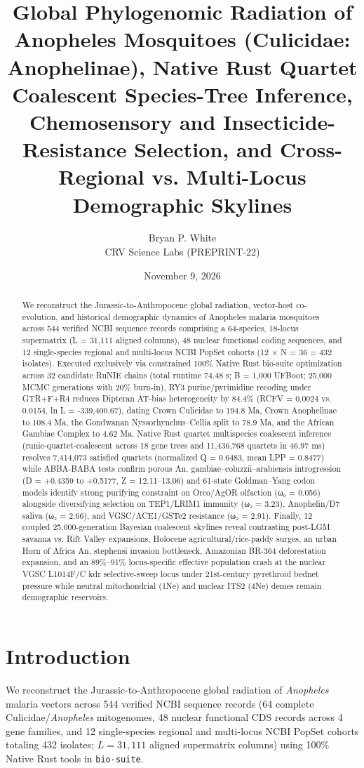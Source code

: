 \documentclass[10pt,letterpaper]{article}
\title{Global Phylogenomic Radiation of Anopheles Mosquitoes (Culicidae: Anophelinae), Native Rust Quartet Coalescent Species-Tree Inference, Chemosensory and Insecticide-Resistance Selection, and Cross-Regional vs. Multi-Locus Demographic Skylines}
\author{Bryan P. White \\ CRV Science Labs (PREPRINT-22)}
\date{November 9, 2026}
\begin{document}
\maketitle
\begin{abstract}
We reconstruct the Jurassic-to-Anthropocene global radiation, vector-host co-evolution, and historical demographic dynamics of Anopheles malaria mosquitoes across 544 verified NCBI sequence records comprising a 64-species, 18-locus supermatrix (L = 31,111 aligned columns), 48 nuclear functional coding sequences, and 12 single-species regional and multi-locus NCBI PopSet cohorts (12 × N = 36 = 432 isolates). Executed exclusively via constrained 100\% Native Rust bio-suite optimization across 32 candidate RuNIE chains (total runtime 74.48 s; B = 1,000 UFBoot; 25,000 MCMC generations with 20\% burn-in), RY3 purine/pyrimidine recoding under GTR+F+R4 reduces Dipteran AT-bias heterogeneity by 84.4\% (RCFV = 0.0024 vs. 0.0154, ln L = -339,400.67), dating Crown Culicidae to 194.8 Ma, Crown Anophelinae to 108.4 Ma, the Gondwanan Nyssorhynchus–Cellia split to 78.9 Ma, and the African Gambiae Complex to 4.62 Ma. Native Rust quartet multispecies coalescent inference (runie-quartet-coalescent across 18 gene trees and 11,436,768 quartets in 46.97 ms) resolves 7,414,073 satisfied quartets (normalized Q = 0.6483, mean LPP = 0.8477) while ABBA-BABA tests confirm porous An. gambiae–coluzzii–arabiensis introgression (D = +0.4359 to +0.5177, Z = 12.11–13.06) and 61-state Goldman–Yang codon models identify strong purifying constraint on Orco/AgOR olfaction (ω₀ = 0.056) alongside diversifying selection on TEP1/LRIM1 immunity (ω₂ = 3.23), Anophelin/D7 saliva (ω₂ = 2.66), and VGSC/ACE1/GSTe2 resistance (ω₂ = 2.91). Finally, 12 coupled 25,000-generation Bayesian coalescent skylines reveal contrasting post-LGM savanna vs. Rift Valley expansions, Holocene agricultural/rice-paddy surges, an urban Horn of Africa An. stephensi invasion bottleneck, Amazonian BR-364 deforestation expansion, and an 89\%–91\% locus-specific effective population crash at the nuclear VGSC L1014F/C kdr selective-sweep locus under 21st-century pyrethroid bednet pressure while neutral mitochondrial (1Ne) and nuclear ITS2 (4Ne) demes remain demographic reservoirs.
\end{abstract}
\section{Introduction}
We reconstruct the Jurassic-to-Anthropocene global radiation of \textit{Anopheles} malaria vectors across 544 verified NCBI sequence records (64 complete Culicidae/\textit{Anopheles} mitogenomes, 48 nuclear functional CDS records across 4 gene families, and 12 single-species regional and multi-locus NCBI PopSet cohorts totaling 432 isolates; $L = 31,111$ aligned supermatrix columns) using 100\% Native Rust tools in \texttt{bio-suite}.
\end{document}
